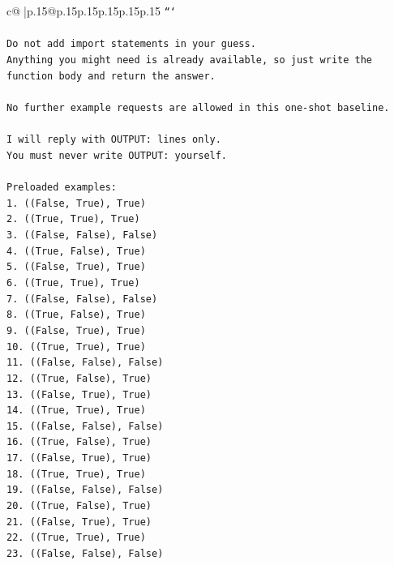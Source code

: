 \documentclass{article}
\begin{document}
{\begin{supertabular}{c@{$\;$}|p{.15\linewidth}@{}p{.15\linewidth}p{.15\linewidth}p{.15\linewidth}p{.15\linewidth}p{.15\linewidth}}
{{{\texttt{```} \\
\\ 
\texttt{Do not add import statements in your guess.} \\
\texttt{Anything you might need is already available, so just write the function body and return the answer.} \\
\\ 
\texttt{No further example requests are allowed in this one{-}shot baseline.} \\
\\ 
\texttt{I will reply with OUTPUT: lines only.} \\
\texttt{You must never write OUTPUT: yourself.} \\
\\ 
\texttt{Preloaded examples:} \\
\texttt{1. ((False, True), True)} \\
\texttt{2. ((True, True), True)} \\
\texttt{3. ((False, False), False)} \\
\texttt{4. ((True, False), True)} \\
\texttt{5. ((False, True), True)} \\
\texttt{6. ((True, True), True)} \\
\texttt{7. ((False, False), False)} \\
\texttt{8. ((True, False), True)} \\
\texttt{9. ((False, True), True)} \\
\texttt{10. ((True, True), True)} \\
\texttt{11. ((False, False), False)} \\
\texttt{12. ((True, False), True)} \\
\texttt{13. ((False, True), True)} \\
\texttt{14. ((True, True), True)} \\
\texttt{15. ((False, False), False)} \\
\texttt{16. ((True, False), True)} \\
\texttt{17. ((False, True), True)} \\
\texttt{18. ((True, True), True)} \\
\texttt{19. ((False, False), False)} \\
\texttt{20. ((True, False), True)} \\
\texttt{21. ((False, True), True)} \\
\texttt{22. ((True, True), True)} \\
\texttt{23. ((False, False), False)} \\
}}}
\end{supertabular}}
\end{document}
